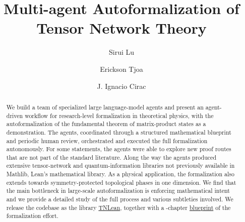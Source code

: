 \documentclass[aps,prl,twocolumn,superscriptaddress,longbibliography,10pt,footinbib]{revtex4-2}
\begin{document}
\title{Multi-agent Autoformalization of Tensor Network Theory}

\author{Sirui Lu}

\author{Erickson Tjoa}

\author{J. Ignacio Cirac}



\begin{abstract}
    We build a team of specialized large language-model agents and present an agent-driven workflow for research-level formalization in theoretical physics, with the autoformalization of the fundamental theorem of matrix-product states as a demonstration. The agents, coordinated through a structured mathematical blueprint and periodic human review,  orchestrated and executed the full formalization autonomously. For some statements,
    the agents were able to explore new proof routes that are not part of the standard literature. Along the way the agents produced extensive tensor-network and quantum-information libraries not previously available in Mathlib, Lean's mathematical library. As a physical application, the formalization also extends towards symmetry-protected topological phases in one dimension. We find that the main bottleneck in large-scale autoformalization is enforcing mathematical intent and we provide a detailed study of the full process and various subtleties involved. We release the codebase as the library \href{https://github.com/LionSR/TNLean}{TNLean}, together with a \nChapters{}-chapter \href{https://lionsr.github.io/TNLean/blueprint/}{blueprint} of the formalization effort.
\end{abstract}


\maketitle
\end{document}
